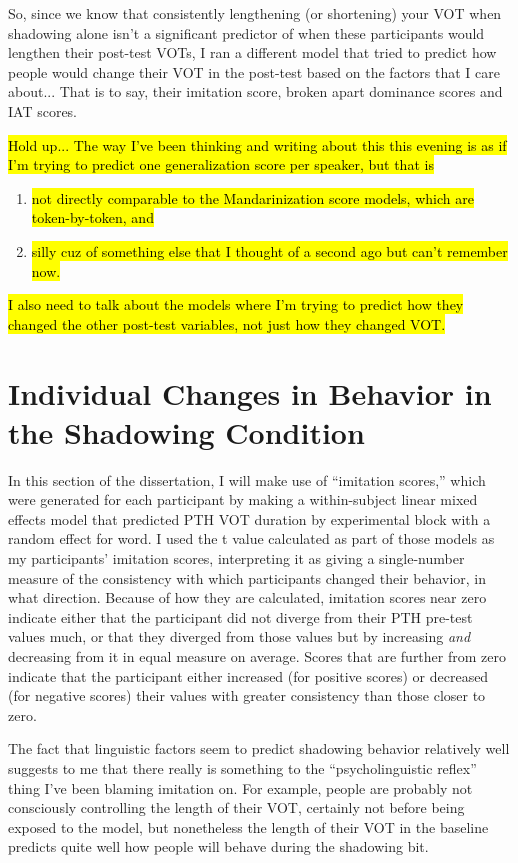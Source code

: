 So, since we know that consistently lengthening (or shortening) your VOT when shadowing alone isn't a significant predictor of when these participants would lengthen their post-test VOTs, I ran a different model that tried to predict how people would change their VOT in the post-test based on the factors that I care about... That is to say, their imitation score, broken apart dominance scores and IAT scores.

\hl{Hold up... The way I've been thinking and writing about this this evening is as if I'm trying to predict one generalization score per speaker, but that is} \begin{enumerate}
\item \hl{not directly comparable to the Mandarinization score models, which are token-by-token, and}
\item \hl{silly cuz of something else that I thought of a second ago but can't remember now.}
\end{enumerate}


\hl{I also need to talk about the models where I'm trying to predict how they changed the other post-test variables, not just how they changed VOT.}

\section{Individual Changes in Behavior in the Shadowing Condition} %
\label{sec:whyDoTheyShadow}
In this section of the dissertation, I will make use of ``imitation scores,'' which were generated for each participant by making a within-subject linear mixed effects model that predicted PTH VOT duration by experimental block with a random effect for word. I used the t value calculated as part of those models as my participants' imitation scores, interpreting it as giving a single-number measure of the consistency with which participants changed their behavior, in what direction. Because of how they are calculated, imitation scores near zero indicate either that the participant did not diverge from their PTH pre-test values much, or that they diverged from those values but by increasing \textit{and} decreasing from it in equal measure on average. Scores that are further from zero indicate that the participant either increased (for positive scores) or decreased (for negative scores) their values with greater consistency than those closer to zero.

The fact that linguistic factors seem to predict shadowing behavior relatively well %
    suggests to me that there really is something to the ``psycholinguistic reflex'' thing I've been blaming imitation on. %
    For example, people are probably not consciously controlling the length of their VOT, certainly not before being exposed to the model, but nonetheless the length of their VOT in the baseline predicts quite well how people will behave during the shadowing bit.


